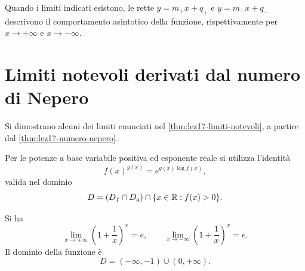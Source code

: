 Quando i limiti indicati esistono, le rette
\(y=m_+x+q_+\) e \(y=m_-x+q_-\) descrivono
il comportamento asintotico della funzione,
rispettivamente per \(x\to+\infty\) e \(x\to-\infty\).

\clearpage

\section{Limiti notevoli derivati dal numero di Nepero}
\label{sec:lez19-limiti-nepero}

Si dimostrano alcuni dei limiti enunciati nel
\cref{thm:lez17-limiti-notevoli}, a partire dal
\cref{thm:lez17-numero-nepero}.

Per le potenze a base variabile positiva ed esponente
reale si utilizza l'identità
\[
  f(x)^{g(x)}=e^{g(x)\log f(x)},
\]
valida nel dominio
\[
  D=(D_f\cap D_g)\cap\{x\in\mathbb{R}:f(x)>0\}.
\]

\begin{proposition}
\label{prop:lez19-nepero-infinito}
Si ha
\[
  \lim_{x\to+\infty}\left(1+\frac1x\right)^x=e,
  \qquad
  \lim_{x\to-\infty}\left(1+\frac1x\right)^x=e.
\]
Il dominio della funzione è
\[
  D=(-\infty,-1)\cup(0,+\infty).
\]
\end{proposition}

